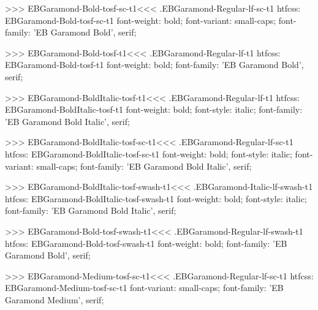 {{{{{{{>>>
\<EBGaramond-Bold-tosf-sc-t1\><<<
.EBGaramond-Regular-lf-sc-t1
htfcss:  EBGaramond-Bold-tosf-sc-t1  font-weight: bold; font-variant: small-caps; font-family: 'EB Garamond Bold', serif;

>>>
\<EBGaramond-Bold-tosf-t1\><<<
.EBGaramond-Regular-lf-t1
htfcss:  EBGaramond-Bold-tosf-t1  font-weight: bold; font-family: 'EB Garamond Bold', serif;

>>>
\<EBGaramond-BoldItalic-tosf-t1\><<<
.EBGaramond-Regular-lf-t1
htfcss:  EBGaramond-BoldItalic-tosf-t1  font-weight: bold; font-style: italic; font-family: 'EB Garamond Bold Italic', serif;

>>>
\<EBGaramond-BoldItalic-tosf-sc-t1\><<<
.EBGaramond-Regular-lf-sc-t1
htfcss:  EBGaramond-BoldItalic-tosf-sc-t1  font-weight: bold; font-style: italic; font-variant: small-caps; font-family: 'EB Garamond Bold Italic', serif;

>>>
\<EBGaramond-BoldItalic-tosf-swash-t1\><<<
.EBGaramond-Italic-lf-swash-t1
htfcss:  EBGaramond-BoldItalic-tosf-swash-t1  font-weight: bold; font-style: italic; font-family: 'EB Garamond Bold Italic', serif;

>>>
\<EBGaramond-Bold-tosf-swash-t1\><<<
.EBGaramond-Regular-lf-swash-t1
htfcss:  EBGaramond-Bold-tosf-swash-t1  font-weight: bold; font-family: 'EB Garamond Bold', serif;

>>>
\<EBGaramond-Medium-tosf-sc-t1\><<<
.EBGaramond-Regular-lf-sc-t1
htfcss:  EBGaramond-Medium-tosf-sc-t1  font-variant: small-caps; font-family: 'EB Garamond Medium', serif;

}}}}}}}
